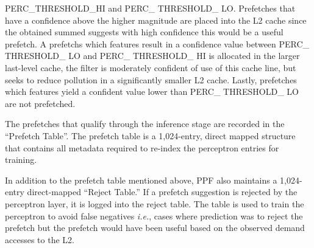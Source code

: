 
PERC\_THRESHOLD\_HI and  
PERC\_ THRESHOLD\_ LO. 
Prefetches that have a confidence above the higher magnitude 
are placed into the L2 cache since the obtained summed suggests with high
confidence this would be a useful prefetch.
A prefetchs which features result in a confidence value between  
PERC\_ THRESHOLD\_ LO and PERC\_ THRESHOLD\_ HI is allocated in the larger 
last-level cache, the filter is moderately confident of use of this 
cache line, but seeks to reduce pollution in a significantly smaller L2 cache. 
Lastly, prefetches which features yield a confident value lower than 
PERC\_ THRESHOLD\_ LO are not prefetched. \newline 


\newline 

The prefetches that qualify through the inference stage are recorded in the 
``Prefetch Table''. The prefetch table is a 1,024-entry, direct mapped 
structure that contains all metadata required to re-index the perceptron 
entries for training. 

In addition to the prefetch table mentioned above, 
PPF also maintains a 1,024-entry direct-mapped ``Reject Table.'' 
If a prefetch suggestion is rejected by the perceptron layer, it is logged into 
the reject table. The table is used to train the perceptron to avoid false negatives 
\textit{i.e.}, cases where prediction was to reject the prefetch but 
the prefetch would have been useful based on the observed demand accesses to the L2. \newline

 \newline


